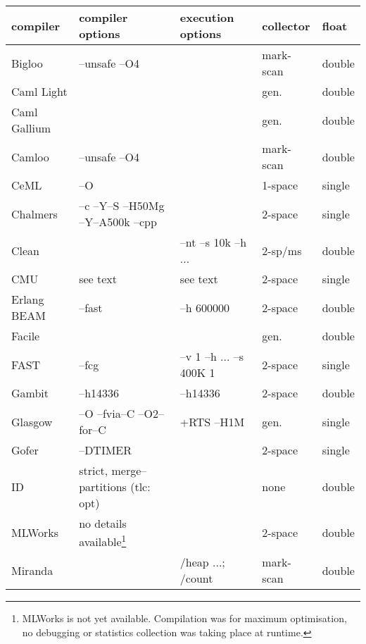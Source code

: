 \begin{table}
\begin{minipage}{\hsize}
\begin{center}
\begin{tabular}{|l|l|l|l|l|}
\hline
compiler     & compiler options& execution options           & collector& float\\
\hline
Bigloo       & --unsafe --O4   &                             & mark-scan& double \\
Caml Light   &                 &                             & gen.     & double \\
Caml Gallium &                 &                             & gen.     & double \\
Camloo       & --unsafe --O4   &                             & mark-scan& double \\
CeML         & --O             &                             & 1-space  & single \\
Chalmers     & --c --Y--S --H50Mg --Y--A500k --cpp &         & 2-space  & single \\
Clean        &                 & --nt --s 10k --h ...        & 2-sp/ms  & double \\
CMU          & see text        & see text                    & 2-space  & single \\
Erlang BEAM  & --fast          & --h 600000                  & 2-space  & double \\
Facile       &                 &                             & gen.     & double \\
FAST         & --fcg           & --v 1 --h ... --s 400K 1    & 2-space  & single \\
Gambit       & --h14336        & --h14336                    & 2-space  & double \\
Glasgow      & --O --fvia--C --O2--for--C & +RTS --H1M&gen.~\cite{San93}& single \\
Gofer        & --DTIMER        &                             & 2-space  & single \\
ID           & strict, merge--partitions (tlc: opt) &        & none     & double \\
MLWorks      &
no details available\footnote{MLWorks is not yet available. Compilation
was for maximum optimisation, no debugging or statistics collection
was taking place at runtime.}  &                             & 2-space  & double \\
Miranda      &                 & /heap ...; /count           & mark-scan& double \\

\end{tabular}
\end{center}
\end{minipage}
\end{table}
